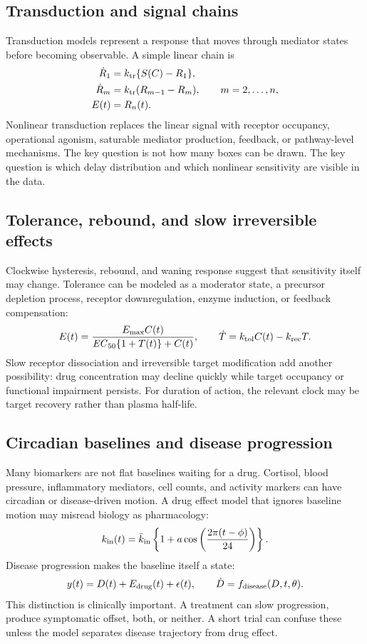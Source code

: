 \documentclass[a4paper]{article}
\newcommand{\pkECfifty}{\pksym{EC}_{50}}
\begin{document}
\figureAdvancedPdDelayLadder

\subsection{Transduction and signal chains}

Transduction models represent a response that moves through mediator states before becoming observable. A simple linear chain is
\[
  \begin{aligned}
  \dot R_1 &= k_{\mathrm{tr}}\{S(C)-R_1\},\\
  \dot R_m &= k_{\mathrm{tr}}(R_{m-1}-R_m),\qquad m=2,\ldots,n,\\
  E(t) &= R_n(t).
  \end{aligned}
\]
Nonlinear transduction replaces the linear signal with receptor occupancy, operational agonism, saturable mediator production, feedback, or pathway-level mechanisms. The key question is not how many boxes can be drawn. The key question is which delay distribution and which nonlinear sensitivity are visible in the data.

\subsection{Tolerance, rebound, and slow irreversible effects}

Clockwise hysteresis, rebound, and waning response suggest that sensitivity itself may change. Tolerance can be modeled as a moderator state, a precursor depletion process, receptor downregulation, enzyme induction, or feedback compensation:
\[
  E(t)=
  \frac{E_{\max}C(t)}{\pkECfifty\{1+T(t)\}+C(t)},
  \qquad
  \dot T = k_{\pklab{tol}}C(t)-k_{\pklab{rec}}T.
\]
Slow receptor dissociation and irreversible target modification add another possibility: drug concentration may decline quickly while target occupancy or functional impairment persists. For duration of action, the relevant clock may be target recovery rather than plasma half-life.

\subsection{Circadian baselines and disease progression}

Many biomarkers are not flat baselines waiting for a drug. Cortisol, blood pressure, inflammatory mediators, cell counts, and activity markers can have circadian or disease-driven motion. A drug effect model that ignores baseline motion may misread biology as pharmacology:
\[
  k_{\mathrm{in}}(t)
  =
  \bar k_{\mathrm{in}}
  \left\{1+a\cos\left(\frac{2\pi(t-\phi)}{24}\right)\right\}.
\]
Disease progression makes the baseline itself a state:
\[
  y(t)=D(t)+E_{\mathrm{drug}}(t)+\epsilon(t),
  \qquad
  \dot D=f_{\mathrm{disease}}(D,t,\theta).
\]
This distinction is clinically important. A treatment can slow progression, produce symptomatic offset, both, or neither. A short trial can confuse these unless the model separates disease trajectory from drug effect.
\end{document}

